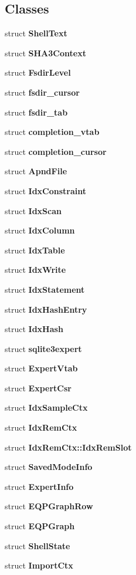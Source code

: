 \subsection*{Classes}
\begin{DoxyCompactItemize}
\item 
struct \textbf{ Shell\+Text}
\item 
struct \textbf{ S\+H\+A3\+Context}
\item 
struct \textbf{ Fsdir\+Level}
\item 
struct \textbf{ fsdir\+\_\+cursor}
\item 
struct \textbf{ fsdir\+\_\+tab}
\item 
struct \textbf{ completion\+\_\+vtab}
\item 
struct \textbf{ completion\+\_\+cursor}
\item 
struct \textbf{ Apnd\+File}
\item 
struct \textbf{ Idx\+Constraint}
\item 
struct \textbf{ Idx\+Scan}
\item 
struct \textbf{ Idx\+Column}
\item 
struct \textbf{ Idx\+Table}
\item 
struct \textbf{ Idx\+Write}
\item 
struct \textbf{ Idx\+Statement}
\item 
struct \textbf{ Idx\+Hash\+Entry}
\item 
struct \textbf{ Idx\+Hash}
\item 
struct \textbf{ sqlite3expert}
\item 
struct \textbf{ Expert\+Vtab}
\item 
struct \textbf{ Expert\+Csr}
\item 
struct \textbf{ Idx\+Sample\+Ctx}
\item 
struct \textbf{ Idx\+Rem\+Ctx}
\item 
struct \textbf{ Idx\+Rem\+Ctx\+::\+Idx\+Rem\+Slot}
\item 
struct \textbf{ Saved\+Mode\+Info}
\item 
struct \textbf{ Expert\+Info}
\item 
struct \textbf{ E\+Q\+P\+Graph\+Row}
\item 
struct \textbf{ E\+Q\+P\+Graph}
\item 
struct \textbf{ Shell\+State}
\item 
struct \textbf{ Import\+Ctx}
\end{DoxyCompactItemize}
